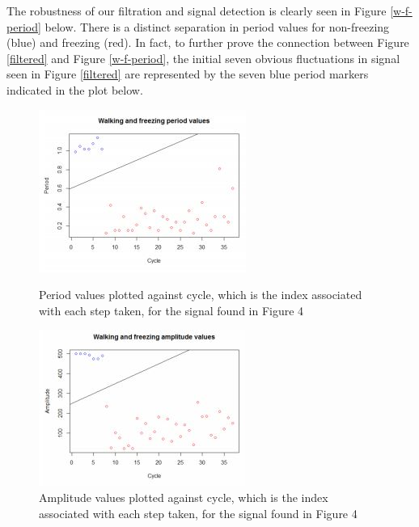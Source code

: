 \documentclass[titlepage]{article}
\begin{document}
\begin{doublespacing}
The robustness of our filtration and signal detection is clearly seen in Figure \ref{w-f-period} below. There is a distinct separation in period values for non-freezing (blue) and freezing (red). In fact, to further prove the connection between Figure \ref{filtered} and Figure \ref{w-f-period}, the initial seven obvious fluctuations in signal seen in Figure \ref{filtered} are represented by the seven blue period markers indicated in the plot below.

\begin{figure}[H]
\centering
\begin{minipage}{.45\textwidth}
	\includegraphics[width=\linewidth]{w-f-period}
	\caption{Period values plotted against cycle, which is the index associated with each step taken, for the signal found in Figure 4}
	\label{w-f-period}
\end{minipage}\hfill
\begin{minipage}{.45\textwidth}
	\includegraphics[width=\linewidth]{w-f-amplitude}
	\caption{Amplitude values plotted against cycle, which is the index associated with each step taken, for the signal found in Figure 4}
	\label{w-f-amplitude}
\end{minipage}
\end{figure}


\end{doublespacing}
\end{document}
